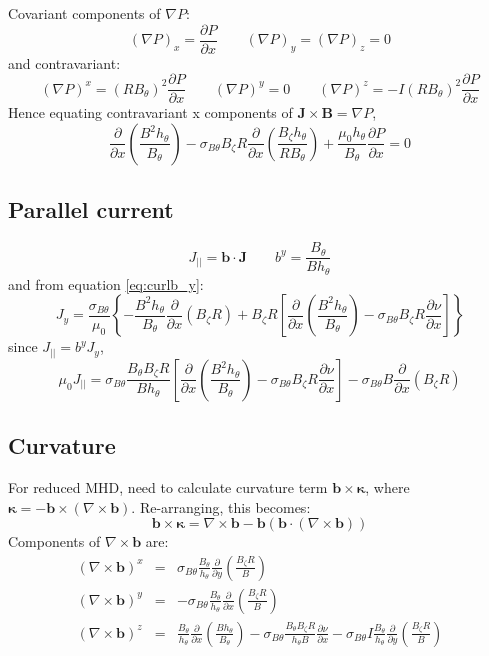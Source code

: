 \documentclass[12pt]{article}
\newcommand{\sbt}{\ensuremath{\sigma_{B\theta}}}
\newcommand{\deriv}[2]{\ensuremath{\frac{\partial #1}{\partial #2}}}
\newcommand{\hthe}{\ensuremath{h_\theta}}
\newcommand{\Bp}{\ensuremath{B_\theta}}
\newcommand{\Bt}{\ensuremath{B_\zeta}}
\newcommand{\Vec}[1]{\ensuremath{\mathbf{#1}}}
\newcommand{\Bvec}{\Vec{B}}
\newcommand{\Jvec}{\Vec{J}}
\newcommand{\rbp}{\ensuremath{R\Bp}}
\newcommand{\rbpsq}{\ensuremath{\left(\rbp\right)^2}}
\begin{document}
Covariant components of $\nabla P$:
\[
\left(\nabla P\right)_x = \deriv{P}{x} \qquad \left(\nabla P\right)_y = \left(\nabla P\right)_z = 0
\]
and contravariant:
\[
\left(\nabla P\right)^x = \rbpsq\deriv{P}{x} \qquad \left(\nabla P\right)^y = 0 \qquad \left(\nabla P\right)^z = -I\rbpsq\deriv{P}{x}
\]
Hence equating contravariant x components of $\Jvec\times\Bvec = \nabla P$,
\begin{equation}
\deriv{}{x}\left(\frac{B^2\hthe}{\Bp}\right) - \sbt\Bt R\deriv{}{x}\left(\frac{\Bt\hthe}{R\Bp}\right) + \frac{\mu_0\hthe}{\Bp}\deriv{P}{x} = 0
\label{eq:xbalance}
\end{equation}

\subsection{Parallel current}

\[
J_{||} = \mathbf{b}\cdot\Jvec \qquad b^y = \frac{\Bp}{B\hthe}
\]
and from equation \ref{eq:curlb_y}:
\[
J_y = \frac{\sbt}{\mu_0}\left\{-\frac{B^2\hthe}{\Bp}\deriv{}{x}\left(\Bt R\right) + \Bt R\left[\deriv{}{x}\left(\frac{B^2\hthe}{\Bp}\right) - \sbt\Bt R\deriv{\nu}{x}\right]\right\}
\]
since $J_{||} = b^yJ_y$,
\[
\mu_0 J_{||} =\sbt\frac{\Bp\Bt R}{B\hthe}\left[\deriv{}{x}\left(\frac{B^2\hthe}{\Bp}\right) - \sbt\Bt R\deriv{\nu}{x}\right] - \sbt B\deriv{}{x}\left(\Bt R\right)
\]

\subsection{Curvature}

For reduced MHD, need to calculate curvature term $\mathbf{b}\times\mathbf{\kappa}$, where
$\mathbf{\kappa} = -\mathbf{b}\times\left(\nabla\times\mathbf{b}\right)$. Re-arranging, this becomes:
\[
\mathbf{b}\times\mathbf{\kappa} = \nabla\times\mathbf{b} - \mathbf{b}\left(\mathbf{b}\cdot\left(\nabla\times\mathbf{b}\right)\right)
\]
Components of $\nabla\times\mathbf{b}$ are:
\begin{eqnarray*}
\left(\nabla\times\mathbf{b}\right)^x &=& \sbt\frac{\Bp}{\hthe}\deriv{}{y}\left(\frac{\Bt R}{B}\right) \\
\left(\nabla\times\mathbf{b}\right)^y &=& -\sbt\frac{\Bp}{\hthe}\deriv{}{x}\left(\frac{\Bt R}{B}\right) \\
\left(\nabla\times\mathbf{b}\right)^z &=& \frac{\Bp}{\hthe}\deriv{}{x}\left(\frac{B\hthe}{\Bp}\right) - \sbt\frac{\Bp\Bt R}{\hthe B}\deriv{\nu}{x} - \sbt I\frac{\Bp}{\hthe}\deriv{}{y}\left(\frac{\Bt R}{B}\right) \\
\end{eqnarray*}
\end{document}
